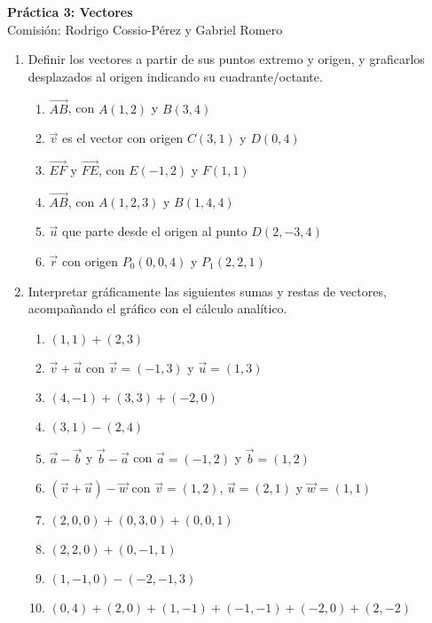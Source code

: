 \documentclass[a4paper]{article}
\newcommand{\exercise}{\item}
\newcommand{\vect}[1]{\overrightarrow{#1}}
\begin{document}
\noindent \hrulefill 
\vspace{-7pt}
\begin{center} 
	\textbf{ Práctica 3: Vectores } \\
	Comisión: Rodrigo Cossio-Pérez y Gabriel Romero
\end{center}
\vspace{-10pt}
\hrulefill
\begin{enumerate}
	\exercise Definir los vectores a partir de sus puntos extremo y origen, y graficarlos desplazados al origen indicando su cuadrante/octante.
	\begin{multicols}{2}
	\begin{enumerate} [label=(\alph*)]
		\item $\vect{AB}$, con $A(1,2)$ y $B(3,4)$
		\item $\vec{v}$ es el vector con origen $C(3,1)$ y $D(0,4)$
		\item $\vect{EF}$ y $\vect{FE}$, con $E(-1,2)$ y $F(1,1)$
		\item $\vect{AB}$, con $A(1,2,3)$ y $B(1,4,4)$
		\item $\vec{u}$ que parte desde el origen al punto $D(2,-3,4)$
		\item $\vec{r}$ con origen $P_0(0,0,4)$ y $P_1(2,2,1)$
	\end{enumerate}
	\end{multicols}
	\exercise Interpretar gráficamente las siguientes sumas y restas de vectores, acompañando el gráfico con el cálculo analítico.
	\begin{multicols}{2}
	\begin{enumerate} [label=(\alph*)]
		\item $(1,1)+(2,3)$
		\item $\vec{v} + \vec{u}$ con $\vec{v}=(-1,3)$ y $\vec{u}=(1,3)$
		\item $(4,-1)+(3,3)+(-2,0)$
		\item $(3,1)-(2,4)$
		\item $\vec{a} - \vec{b}$ y $\vec{b} - \vec{a}$ con $\vec{a}=(-1,2)$ y $\vec{b}=(1,2)$
		\item $\left(\vec{v}+\vec{u}\right)-\vec{w}$ con $\vec{v}=(1,2)$, $\vec{u}=(2,1)$ y $\vec{w}=(1,1)$
		\item $(2,0,0)+(0,3,0)+(0,0,1)$
		\item $(2,2,0)+(0,-1,1)$
		\item $(1,-1,0)-(-2,-1,3)$
		\item $(0,4)+(2,0)+(1,-1)+(-1,-1)+(-2,0)+(2,-2)$
	\end{enumerate}

\end{multicols}
\end{enumerate}
\end{document}
